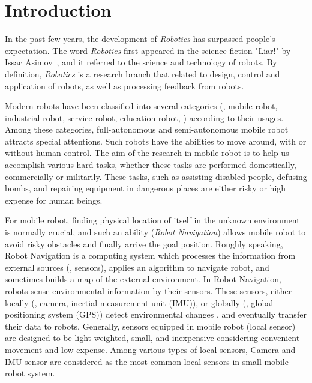 \chapter{Introduction}
\label{chap:intro}

In the past few years, the development of \textit{Robotics} has surpassed people's expectation. The word \textit{Robotics} first appeared in the science fiction "Liar!" by Issac Asimov~\cite{wiki:Robotics}, and it referred to the science and technology of robots. By definition, \textit{Robotics} is a research branch that related to design, control and application of robots, as well as processing feedback from robots. 

Modern robots have been classified into several categories (\eg, mobile robot, industrial robot, service robot, education robot, \etc) according to their usages. Among these categories, full-autonomous and semi-autonomous mobile robot attracts special attentions. Such robots have the abilities to move around, with or without human control. The aim of the research in mobile robot is to help us accomplish various hard tasks, whether these tasks are performed domestically, commercially or militarily. These tasks, such as assisting disabled people, defusing bombs, and repairing equipment in dangerous places are either risky or high expense for human beings.    

For mobile robot, finding physical location of itself in the unknown environment is normally crucial, and such an ability (\textit{Robot Navigation}) allows mobile robot to avoid risky obstacles and finally arrive the goal position. Roughly speaking, Robot Navigation is a computing system which processes the information from external sources (\eg, sensors), applies an algorithm to navigate robot, and sometimes builds a map of the external environment. In Robot Navigation, robots sense environmental information by their sensors. These sensors, either locally (\eg, camera, inertial measurement unit (IMU)), or globally (\eg, global positioning system (GPS)) detect environmental changes , and eventually transfer their data to robots. Generally, sensors equipped in mobile robot (local sensor) are designed to be light-weighted, small, and inexpensive considering convenient movement and low expense. Among various types of local sensors, Camera and IMU sensor are considered as the most common local sensors in small mobile robot system.

